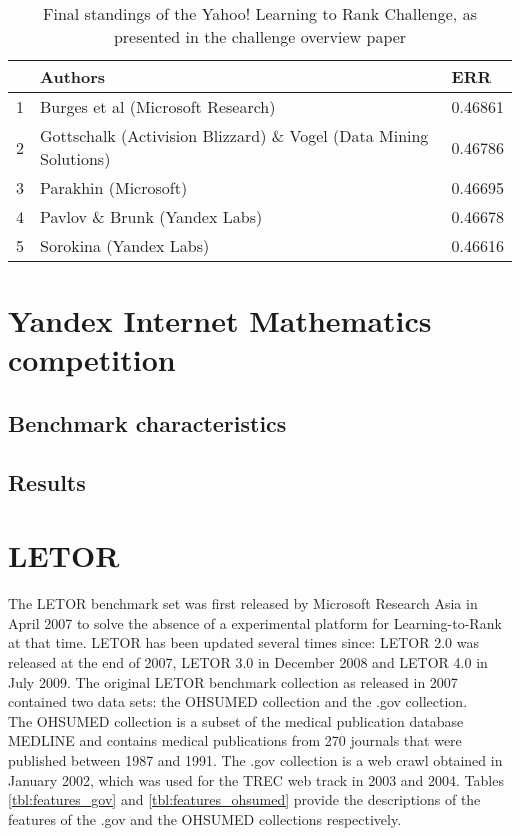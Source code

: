 \begin{table}
\begin{tabular}{l|p{6.3cm}|l}
 & Authors & ERR \\
 \hline 
1 & Burges et al (Microsoft Research) & 0.46861 \\ 
2 & Gottschalk (Activision Blizzard) \& Vogel (Data Mining Solutions) & 0.46786 \\ 
3 & Parakhin (Microsoft) & 0.46695 \\ 
4 & Pavlov \& Brunk (Yandex Labs) & 0.46678 \\ 
5 & Sorokina (Yandex Labs) & 0.46616 \\ 
\end{tabular}
\caption{Final standings of the Yahoo! Learning to Rank Challenge, as presented in the challenge overview paper\cite{Chapelle2011a}}
\label{fig:yahoo_results}
\end{table}



\chapter{Yandex Internet Mathematics competition}
\section{Benchmark characteristics}
\section{Results}



\chapter{LETOR}
The LETOR benchmark set was first released by Microsoft Research Asia in April 2007 to solve the absence of a experimental platform for Learning-to-Rank at that time. LETOR has been updated several times since: LETOR 2.0 was released at the end of 2007, LETOR 3.0 in December 2008 and LETOR 4.0 in July 2009. The original LETOR benchmark collection\cite{Liu2007b} as released in 2007 contained two data sets: the OHSUMED collection and the .gov collection.\\

The OHSUMED collection is a subset of the medical publication database MEDLINE and contains medical publications from 270 journals that were published between 1987 and 1991. The .gov collection is a web crawl obtained in January 2002, which was used for the TREC web track in 2003 and 2004. Tables \ref{tbl:features_gov} and \ref{tbl:features_ohsumed} provide the descriptions of the features of the .gov and the OHSUMED collections respectively.\\
